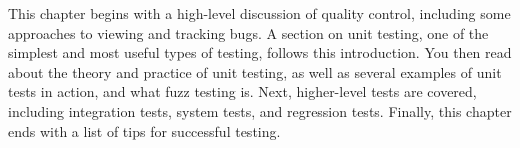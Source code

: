 This chapter begins with a high-level discussion of quality control, including some approaches to viewing and tracking bugs. A section on unit testing, one of the simplest and most useful types of testing, follows this introduction. You then read about the theory and practice of unit testing, as well as several examples of unit tests in action, and what fuzz testing is. Next, higher-level tests are covered, including integration tests, system tests, and regression tests. Finally, this chapter ends with a list of tips for successful testing.
